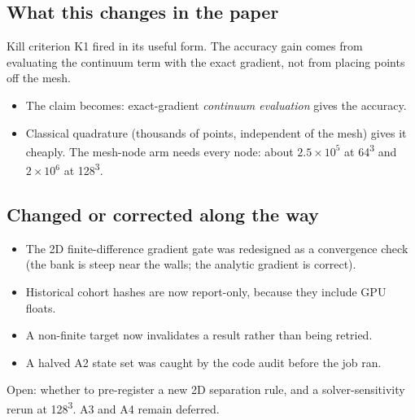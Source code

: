 \subsection*{What this changes in the paper}
Kill criterion K1 fired in its useful form. The accuracy gain comes from evaluating the continuum term with the exact gradient, not from placing points off the mesh.
\begin{itemize}
\item The claim becomes: exact-gradient \emph{continuum evaluation} gives the accuracy.
\item Classical quadrature (thousands of points, independent of the mesh) gives it cheaply. The mesh-node arm needs every node: about $2.5\times10^5$ at 64\textsuperscript{3} and $2\times10^6$ at 128\textsuperscript{3}.
\end{itemize}

\subsection*{Changed or corrected along the way}
\begin{itemize}
\item The 2D finite-difference gradient gate was redesigned as a convergence check (the bank is steep near the walls; the analytic gradient is correct).
\item Historical cohort hashes are now report-only, because they include GPU floats.
\item A non-finite target now invalidates a result rather than being retried.
\item A halved A2 state set was caught by the code audit before the job ran.
\end{itemize}
Open: whether to pre-register a new 2D separation rule, and a solver-sensitivity rerun at 128\textsuperscript{3}. A3 and A4 remain deferred.
